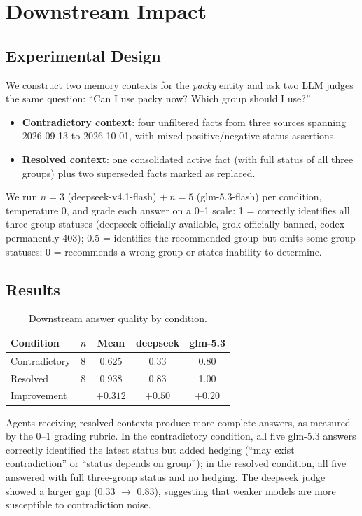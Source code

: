 \documentclass{article}
\begin{document}
\section{Downstream Impact}
\label{sec:downstream}

\subsection{Experimental Design}
We construct two memory contexts for the \emph{packy} entity and ask two LLM judges the same question: ``Can I use packy now? Which group should I use?''

\begin{itemize}
\item \textbf{Contradictory context}: four unfiltered facts from three sources spanning 2026-09-13 to 2026-10-01, with mixed positive/negative status assertions.
\item \textbf{Resolved context}: one consolidated active fact (with full status of all three groups) plus two superseded facts marked as replaced.
\end{itemize}

We run $n{=}3$ (deepseek-v4.1-flash) $+\ n{=}5$ (glm-5.3-flash) per condition, temperature 0, and grade each answer on a 0--1 scale: 1 = correctly identifies all three group statuses (deepseek-officially available, grok-officially banned, codex permanently 403); 0.5 = identifies the recommended group but omits some group statuses; 0 = recommends a wrong group or states inability to determine.

\subsection{Results}

\begin{table}[h]
\centering
\caption{Downstream answer quality by condition.}
\begin{tabular}{lcccc}
\toprule
Condition & $n$ & Mean & deepseek & glm-5.3 \\
\midrule
Contradictory & 8 & 0.625 & 0.33 & 0.80 \\
Resolved & 8 & 0.938 & 0.83 & 1.00 \\
\midrule
Improvement & & $+0.312$ & $+0.50$ & $+0.20$ \\
\bottomrule
\end{tabular}
\end{table}

Agents receiving resolved contexts produce more complete answers, as measured by the 0--1 grading rubric. In the contradictory condition, all five glm-5.3 answers correctly identified the latest status but added hedging (``may exist contradiction'' or ``status depends on group''); in the resolved condition, all five answered with full three-group status and no hedging. The deepseek judge showed a larger gap (0.33 $\to$ 0.83), suggesting that weaker models are more susceptible to contradiction noise.
\end{document}

